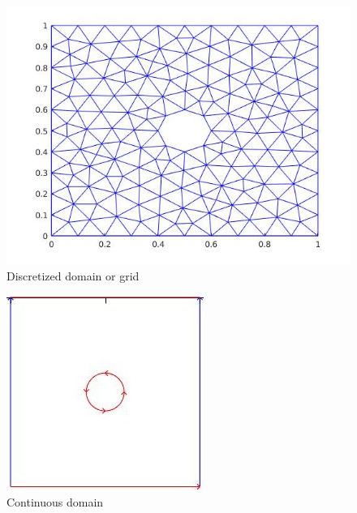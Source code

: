 \documentclass[a4paper,12pt]{book}
\begin{document}
\newpage

\begin{figure}
  \includegraphics[width=\linewidth,scale=0.5]{grid.jpg}
  \caption{Discretized domain or grid}
  \label{fig:Mesh}
\end{figure}

\begin{figure}
  \includegraphics[width=\linewidth,scale=0.5]{domain.jpg}
  \caption{Continuous domain}
  \label{fig:Domain}
\end{figure}
\end{document}
